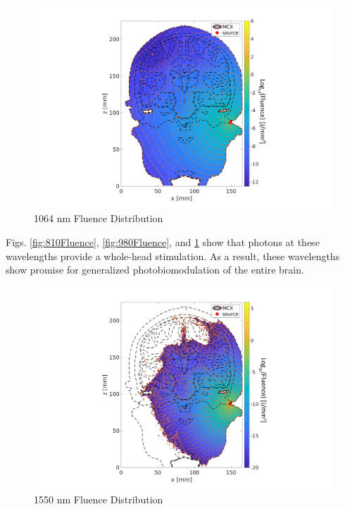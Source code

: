 \documentclass[journal,twoside,web]{ieeecolor}
\begin{document}
\begin{figure}[hbt!]
    \includegraphics[width=\linewidth]{Figures/Fluence_Distribution_1064nm_Cochlear.png}
    \caption{1064 nm Fluence Distribution}
    \label{fig:1064Fluence}
\end{figure}

Figs. \ref{fig:810Fluence}, \ref{fig:980Fluence}, and \ref{fig:1064Fluence} show that photons at these wavelengths provide a whole-head stimulation. As a result, 
these wavelengths show promise for generalized photobiomodulation of the entire brain. 

\begin{figure}[hbt!]
    \includegraphics[width=\linewidth]{Figures/Fluence_Distribution_1550nm_Cochlear.png}
    \caption{1550 nm Fluence Distribution}
    \label{fig:1550Fluence}
\end{figure}
\end{document}
